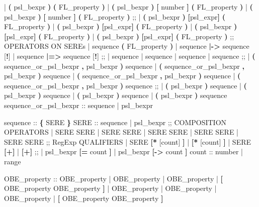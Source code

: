 \begin{Grammar}
 |  \textbf{(} psl_bexpr \textbf{)} \textbf{(} FL_property \textbf{)}
 |  \textbf{(} psl_bexpr \textbf{)} \textbf{[} number \textbf{]}  \textbf{(} FL_property \textbf{)}
 |  \textbf{(} psl_bexpr \textbf{)} \textbf{[} number \textbf{]}  \textbf{(} FL_property \textbf{)}
 ;;
 |  \textbf{(} psl_bexpr \textbf{)} \textbf{[}psl_expr\textbf{]}  \textbf{(} FL_property \textbf{)}
 |  \textbf{(} psl_bexpr \textbf{)} \textbf{[}psl_expr\textbf{]}  \textbf{(} FL_property \textbf{)}
 |  \textbf{(} psl_bexpr \textbf{)} \textbf{[}psl_expr\textbf{]}  \textbf{(} FL_property \textbf{)}
 |  \textbf{(} psl_bexpr \textbf{)} \textbf{[}psl_expr\textbf{]}  \textbf{(} FL_property \textbf{)}
 ;; OPERATORS ON SEREs
 | sequence \textbf{(} FL_property \textbf{)}
 | sequence \textbf{|->} sequence [\textbf{!}]
 | sequence \textbf{|=>} sequence [\textbf{!}]
 ;;
 |  sequence
 |  sequence
 |  sequence
 |  sequence
 ;;
 |  \textbf{(} sequence_or_psl_bexpr \textbf{,} psl_bexpr \textbf{)} sequence
 |  \textbf{(} sequence_or_psl_bexpr \textbf{,} psl_bexpr \textbf{)} sequence
 |  \textbf{(} sequence_or_psl_bexpr \textbf{,} psl_bexpr \textbf{)} sequence
 |  \textbf{(} sequence_or_psl_bexpr \textbf{,} psl_bexpr \textbf{)} sequence
 ;;
 |  \textbf{(} psl_bexpr \textbf{)} sequence
 |  \textbf{(} psl_bexpr \textbf{)} sequence
 |  \textbf{(} psl_bexpr \textbf{)} sequence
 |  \textbf{(} psl_bexpr \textbf{)} sequence
sequence_or_psl_bexpr ::
   sequence
 | psl_bexpr
\end{Grammar}
%
%
\begin{Grammar}
sequence ::
   \textbf{\{} SERE \textbf{\}}
SERE ::
   sequence
 | psl_bexpr
 ;; COMPOSITION OPERATORS
 | SERE \operator{;} SERE
 | SERE \operator{:} SERE
 | SERE \operator{&} SERE
 | SERE \operator{&&} SERE
 | SERE \operator{|} SERE
 ;; RegExp QUALIFIERS
 | SERE \textbf{[*} [count] \textbf{]}
 | \textbf{[*} [count] \textbf{]}
 | SERE \textbf{[+]}
 | \textbf{[+]}
 ;;
 | psl_bexpr \textbf{[=} count \textbf{]}
 | psl_bexpr \textbf{[->} count \textbf{]}
count ::
   number
 | range
\end{Grammar}
%
\begin{Grammar}
OBE_property ::
    OBE_property
 |  OBE_property
 |  OBE_property
 |  \textbf{[} OBE_property  OBE_property \textbf{]}
 |  OBE_property
 |  OBE_property
 |  OBE_property
 |  \textbf{[} OBE_property  OBE_property \textbf{]}
\end{Grammar}
%
